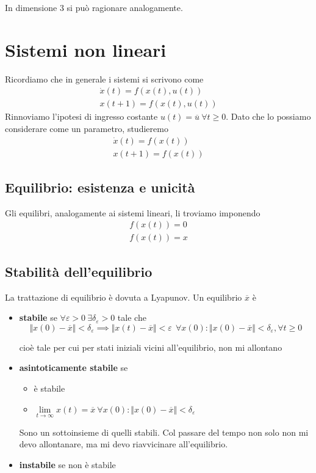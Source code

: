 In dimensione $3$ si può ragionare analogamente.

\chapter{Sistemi non lineari}

Ricordiamo che in generale i sistemi si scrivono come
\begin{gather*}
	\dot{x}(t) =f(x(t) ,u(t))\\
	x(t+1) =f(x(t) ,u(t))
\end{gather*}
Rinnoviamo l'ipotesi di ingresso costante $u(t) =\overline{u} \ \forall t\geq 0$. Dato che lo possiamo considerare come un parametro, studieremo
\begin{gather*}
	\dot{x}(t) =f(x(t))\\
	x(t+1) =f(x(t))
\end{gather*}

\section{Equilibrio: esistenza e unicità}

Gli equilibri, analogamente ai sistemi lineari, li troviamo imponendo
\begin{gather*}
	f(x(t)) =0\\
	f(x(t)) =x
\end{gather*}

\section{Stabilità dell'equilibrio}

La trattazione di equilibrio è dovuta a Lyapunov. Un equilibrio $\overline x$ è
\begin{itemize}
	\item \textbf{stabile} se $\forall \varepsilon  >0\ \exists \delta _{\varepsilon }  >0$ tale che\begin{equation*}
	      \Vert x(0) -\overline{x}\Vert < \delta _{\varepsilon } \implies \Vert x(t) -\overline{x}\Vert < \varepsilon \ \ \forall x(0) :\Vert x(0) -\overline{x}\Vert < \delta _{\varepsilon } ,\forall t\geq 0
	\end{equation*}
	
	cioè tale per cui per stati iniziali vicini all'equilibrio, non mi allontano
	\item \textbf{asintoticamente stabile} se
	      \begin{itemize}
	      	\item è stabile
	      	\item $\lim\limits _{t\to \infty } x(t) =\overline{x} \ \forall x(0) :\Vert x(0) -\overline{x}\Vert < \delta _{\varepsilon }$
	      \end{itemize}
	      
	      Sono un sottoinsieme di quelli stabili. Col passare del tempo non solo non mi devo allontanare, ma mi devo riavvicinare all'equilibrio.
	\item \textbf{instabile} se non è stabile
\end{itemize}

